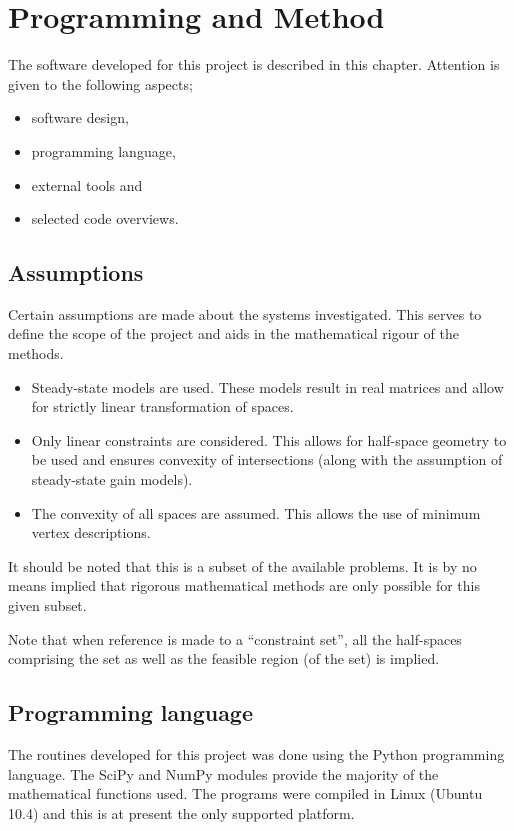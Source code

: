 \chapter{Programming and Method}\label{chap:prog}
\begin{overview}
  The software developed for this project is described in this chapter.
  Attention is given to the following aspects;
  \begin{itemize}
    \item software design,
    \item programming language,
    \item external tools and
    \item selected code overviews.
  \end{itemize}
\end{overview}

\section{Assumptions}
Certain assumptions are made about the systems investigated.
This serves to define the scope of the project and aids in the mathematical rigour of the methods.
\begin{itemize}
\item Steady-state models are used.
  These models result in real matrices and allow for strictly linear transformation of spaces.
\item Only linear constraints are considered.
  This allows for half-space geometry to be used and ensures convexity of intersections (along with the assumption of steady-state gain models).
\item The convexity of all spaces are assumed.
  This allows the use of minimum vertex descriptions.
\end{itemize}
It should be noted that this is a subset of the available problems.
It is by no means implied that rigorous mathematical methods are only possible for this given subset.

Note that when reference is made to a ``constraint set'', all the half-spaces comprising the set as well as the feasible region (of the set) is implied.

\section{Programming language}
The routines developed for this project was done using the Python programming language.
The SciPy and NumPy modules provide the majority of the mathematical functions used.
The programs were compiled in Linux (Ubuntu 10.4) and this is at present the only supported platform.

